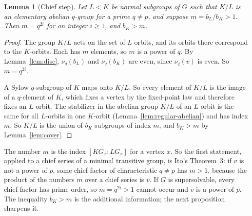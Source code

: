 \documentclass[11pt]{amsart}
\newtheorem{lemma}[theorem]{Lemma}
\theoremstyle{definition}
\theoremstyle{remark}
\begin{document}
\begin{lemma}[Chief step]\label{lem:chief}
Let $L<K$ be normal subgroups of $G$ such that $K/L$ is an elementary abelian $q$-group for a prime $q\ne p$, and suppose $m=b_L/b_K>1$. Then $m=q^{2i}$ for an integer $i\ge1$, and $b_K>m$.
\end{lemma}
\begin{proof}
The group $K/L$ acts on the set of $L$-orbits, and its orbits there correspond to the $K$-orbits. Each has $m$ elements, so $m$ is a power of $q$. By Lemma~\ref{lem:disc}, $\nu_q(b_L)$ and $\nu_q(b_K)$ are even, since $\nu_q(v)$ is even. So $m=q^{2i}$.

A Sylow $q$-subgroup of $K$ maps onto $K/L$. So every element of $K/L$ is the image of a $q$-element of $K$, which fixes a vertex by the fixed-point law and therefore fixes an $L$-orbit. The stabilizer in the abelian group $K/L$ of an $L$-orbit is the same for all $L$-orbits in one $K$-orbit (Lemma~\ref{lem:regular-abelian}) and has index $m$. So $K/L$ is the union of $b_K$ subgroups of index $m$, and $b_K>m$ by Lemma~\ref{lem:cover}.
\end{proof}

The number $m$ is the index $[KG_x:LG_x]$ for a vertex $x$. So the first statement, applied to a chief series of a minimal transitive group, is Ito's Theorem~3: if $v$ is not a power of $p$, some chief factor of characteristic $q\ne p$ has $m>1$, because the product of the numbers $m$ over a chief series is $v$. If $G$ is supersolvable, every chief factor has prime order, so $m=q^{2i}>1$ cannot occur and $v$ is a power of $p$. The inequality $b_K>m$ is the additional information; the next proposition sharpens it.
\end{document}

